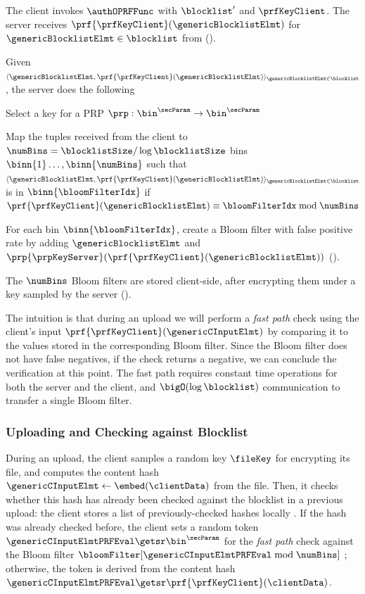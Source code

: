 \enumListStart

\item The client invokes $\authOPRFFunc$ with $\blocklist'$ and $\prfKeyClient$. The server receives  $\prf{\prfKeyClient}(\genericBlocklistElmt)$ for $\genericBlocklistElmt \in \blocklist$ from \authOPRFFunc (). 

\item Given $\langle \genericBlocklistElmt, \prf{\prfKeyClient}(\genericBlocklistElmt) \rangle_{\genericBlocklistElmt \in \blocklist}$, the server does the following

\enumListStart
\item Select a key for a PRP $\prp: \bin^{\secParam} \rightarrow \bin^{\secParam}$
\item Map the tuples received from the client to $\numBins = \blocklistSize/ \log \blocklistSize$ bins $\binn{1} \dots, \binn{\numBins}$ such that $\langle \genericBlocklistElmt, \prf{\prfKeyClient}(\genericBlocklistElmt) \rangle_{\genericBlocklistElmt \in \blocklist}$ is in $\binn{\bloomFilterIdx}$ if $ \prf{\prfKeyClient}(\genericBlocklistElmt) \equiv \bloomFilterIdx \bmod \numBins$
\item For each bin $\binn{\bloomFilterIdx}$, create a Bloom filter with false positive rate \bloomFilterEpsilon by adding $\genericBlocklistElmt$ and $\prp{\prpKeyServer}(\prf{\prfKeyClient}(\genericBlocklistElmt))$ (). 
\item The $\numBins$ Bloom filters are stored client-side, after encrypting them under a key sampled by the server ().
\enumListEnd
\enumListEnd

The intuition is that during an upload we will perform a \emph{fast path} check using the client's input $\prf{\prfKeyClient}(\genericCInputElmt)$ by comparing it to the values stored in the corresponding Bloom filter. Since the Bloom filter does not have false negatives, if the check returns a negative, we can conclude the verification at this point. The fast path requires constant time operations for both the server and the client, and $\bigO(\log \blocklist)$ communication to transfer a single Bloom filter. 

\subsubsection{Uploading and Checking against Blocklist}
%
During an upload, the client samples a random key $\fileKey$ for encrypting its file, and computes the content hash $\genericCInputElmt \gets \embed(\clientData)$ from the file. Then, it checks whether this hash has already been checked against the blocklist in a previous upload: the client stores a list of previously-checked hashes locally \prevHashList. If the hash was already checked before, the client sets a random token $\genericCInputElmtPRFEval \getsr \bin^{\secParam}$ for the \emph{fast path} check against the Bloom filter $\bloomFilter[\genericCInputElmtPRFEval \bmod \numBins]$ ; otherwise, the token is derived from the content hash $\genericCInputElmtPRFEval \getsr \prf{\prfKeyClient}(\clientData)$.

